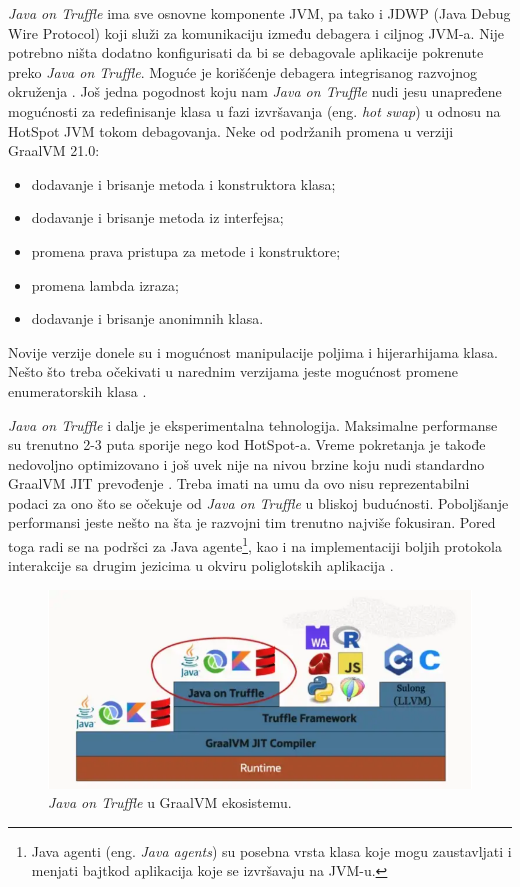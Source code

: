 \documentclass[a4paper]{article}
\begin{document}
\emph{Java on Truffle} ima sve osnovne komponente JVM, pa tako i JDWP (Java Debug Wire Protocol) koji služi za komunikaciju između debagera i ciljnog JVM-a. Nije potrebno ništa dodatno konfigurisati da bi se debagovale aplikacije pokrenute preko \emph{Java on Truffle}. Moguće je korišćenje debagera integrisanog razvojnog okruženja \cite{graalvmjavaontruffle}. Još jedna pogodnost koju nam \emph{Java on Truffle} nudi jesu unapređene mogućnosti za redefinisanje klasa u fazi izvršavanja (eng. \emph{hot swap}) u odnosu na HotSpot JVM tokom debagovanja. Neke od podržanih promena u verziji GraalVM 21.0:
\begin{itemize}
    \item dodavanje i brisanje metoda i konstruktora klasa;
    \item dodavanje i brisanje metoda iz interfejsa;
    \item promena prava pristupa za metode i konstruktore;
    \item promena lambda izraza;
    \item dodavanje i brisanje anonimnih klasa.
\end{itemize}
Novije verzije donele su i mogućnost manipulacije poljima i hijerarhijama klasa. Nešto što treba očekivati u narednim verzijama jeste mogućnost promene enumeratorskih klasa \cite{graalvmjavaontruffle}.

\emph{Java on Truffle} i dalje je eksperimentalna tehnologija. Maksimalne performanse su trenutno 2-3 puta sporije nego kod HotSpot-a. Vreme pokretanja je takođe nedovoljno optimizovano i još uvek nije na nivou brzine koju nudi standardno GraalVM JIT prevođenje \cite{graalvmjavaontruffle}. Treba imati na umu da ovo nisu reprezentabilni podaci za ono što se očekuje od \emph{Java on Truffle} u bliskoj budućnosti. Poboljšanje performansi jeste nešto na šta je razvojni tim trenutno najviše fokusiran. Pored toga radi se na podršci za Java agente\footnote{Java agenti (eng. \emph{Java agents}) su posebna vrsta klasa koje mogu zaustavljati i menjati bajtkod aplikacija koje se izvršavaju na JVM-u.}, kao i na implementaciji boljih protokola interakcije sa drugim jezicima u okviru poliglotskih aplikacija \cite{graalvmjavaontruffle}.


\begin{figure}
	\begin{center}
	\includegraphics[scale=0.35]{imgs/java_on_truffle.png}
	\end{center}
	\caption{\emph{Java on Truffle} u GraalVM ekosistemu.}
	\label{fig:javaontruffle}
\end{figure}
\end{document}
